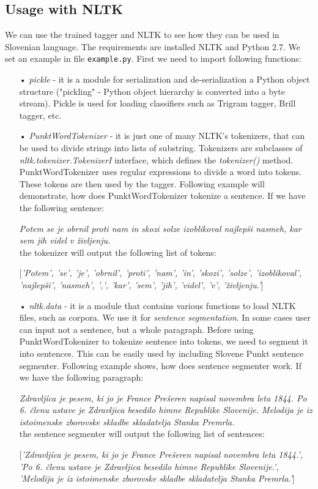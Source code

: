 \documentclass[10pt, conference, compsocconf]{IEEEtran}
\begin{document}
\subsection{Usage with NLTK} %

We can use the trained tagger and NLTK to see how they can be used in Slovenian language. The requirements are installed NLTK and Python 2.7. We set an example in file \texttt{example.py}.
First we need to import following functions:
\begin{itemize}
\item[•] \textit{pickle} - it is a module for serialization and de-serialization a Python object structure ("pickling" - Python object hierarchy is converted into a byte stream). Pickle is used for loading classifiers such as Trigram tagger, Brill tagger, etc.

\item[•] \textit{PunktWordTokenizer} \cite{tokenizer} - it  is just one of many NLTK's tokenizers, that can be used to divide strings into lists of substring. Tokenizers are subclasses of \textit{nltk.tokenizer.TokenizerI} interface, which defines the \textit{tokenizer()} method. PunktWordTokenizer uses regular expressions to divide a word into tokens. These tokens are then used by the tagger. Following example will demonstrate, how does PunktWordTokenizer tokenize a sentence. If we have the following sentence:

\textit{Potem se je obrnil proti nam in skozi solze izoblikoval najlepši nasmeh, kar sem jih videl v življenju.}\\
the tokenizer will output the following list of tokens:

[\textit{'Potem', 'se', 'je', 'obrnil', 'proti', 'nam', 'in', 'skozi', 'solze', 'izoblikoval', 'najlepši', 'nasmeh', ',', 'kar', 'sem', 'jih', 'videl', 'v', 'življenju.'}]
\item[•] \textit{nltk.data} - it is a module that contains various functions to load NLTK files, such as corpora. We use it for \textit{sentence segmentation}. In some cases user can input not a sentence, but a whole paragraph. Before using PunktWordTokenizer to tokenize sentence into tokens, we need to segment it into sentences. This can be easily used by including Slovene Punkt sentence segmenter. Following example shows, how does sentence segmenter work. If we have the following paragraph:

\textit{Zdravljíca je pesem, ki jo je France Prešeren napisal novembra leta 1844. Po 6. členu ustave je Zdravljica besedilo himne Republike Slovenije. Melodija je iz istoimenske zborovske skladbe skladatelja Stanka Premrla.}\\

the sentence segmenter will output the following list of sentences:

[\textit{'Zdravljíca je pesem, ki jo je France Prešeren napisal novembra leta 1844.', 'Po 6. členu ustave je Zdravljica besedilo himne Republike Slovenije.', 'Melodija je iz istoimenske zborovske skladbe skladatelja Stanka Premrla.'}]
\end{itemize} 
\end{document}
